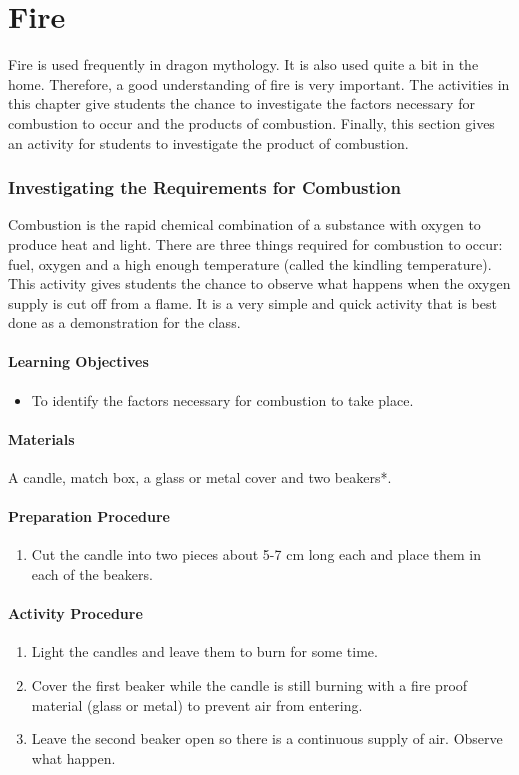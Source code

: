 \chapter{Fire}
Fire is used frequently in dragon mythology. It is also used quite a bit in the home. Therefore, a good understanding of fire is very important.
The activities in this chapter give students the chance to investigate the factors necessary for combustion to occur and the products of combustion. Finally, this section gives an activity for students to investigate the product of combustion.

\subsection{Investigating the Requirements for Combustion}
Combustion is the rapid chemical combination of a substance with oxygen to produce heat and light. There are three things required for combustion to occur: fuel, oxygen and a high enough temperature (called the kindling temperature). This activity gives students the chance to observe what happens when the oxygen supply is cut off from a flame. It is a very simple and quick activity that is best done as a demonstration for the class.
\subsubsection*{Learning Objectives}
\begin{itemize}
\item{To identify the factors necessary for combustion to take place.}
\end{itemize}

\subsubsection*{Materials}
A candle, match box, a glass or metal cover and two beakers*.

\subsubsection*{Preparation Procedure}
\begin{enumerate}
\item{Cut the candle into two pieces about 5-7 cm long each and place them in each of the beakers.}
\end{enumerate}

\subsubsection*{Activity Procedure}
\begin{enumerate}
\item{Light the candles and leave them to burn for some time.}
\item{Cover the first beaker while the candle is still burning with a fire proof material (glass or metal) to prevent air from entering.}
\item{Leave the second beaker open so there is a continuous supply of air. Observe what happen.}
\end{enumerate}

